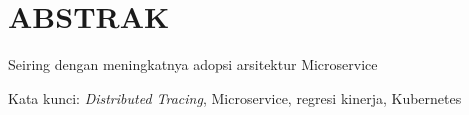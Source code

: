 \clearpage
\chapter*{ABSTRAK}

Seiring dengan meningkatnya adopsi arsitektur Microservice 


\vspace{15mm}
Kata kunci: \textit{Distributed Tracing}, Microservice, regresi kinerja, Kubernetes
\clearpage